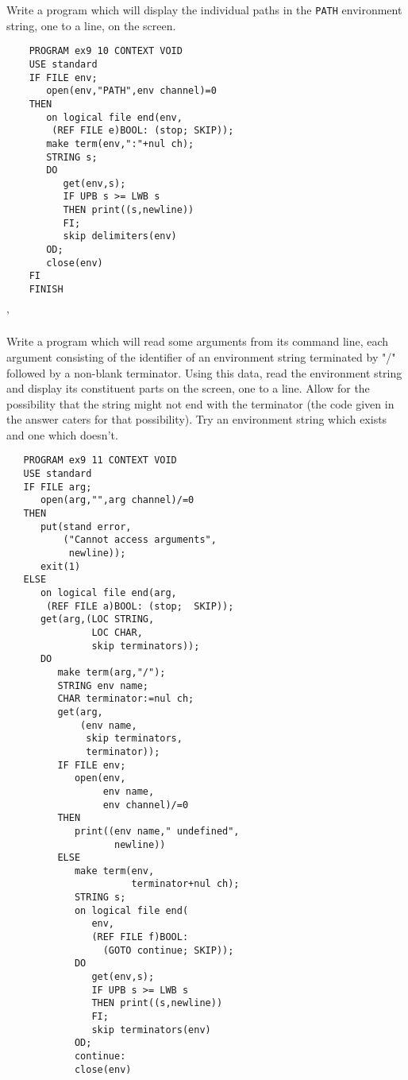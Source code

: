 \begin{exercise}
\item Write a program which will display the individual paths in the
\verb|PATH| environment string, one to a line, on the screen.
\ans \ %
\begin{verbatim}
    PROGRAM ex9 10 CONTEXT VOID
    USE standard
    IF FILE env;
       open(env,"PATH",env channel)=0
    THEN
       on logical file end(env,
        (REF FILE e)BOOL: (stop; SKIP));
       make term(env,":"+nul ch);
       STRING s;
       DO
          get(env,s);
          IF UPB s >= LWB s
          THEN print((s,newline))
          FI;
          skip delimiters(env)
       OD;
       close(env)
    FI
    FINISH
\end{verbatim}
'
\item Write a program which will read some arguments from its command
line, each argument consisting of the identifier of an environment
string terminated by "/" followed by a non-blank terminator. Using
this data, read the environment string and display its constituent
parts on the screen, one to a line. Allow for the possibility that
the string might not end with the terminator (the code given in the
answer caters for that possibility). Try an environment string
which exists and one which doesn't.
\ans \ %
\begin{verbatim}
   PROGRAM ex9 11 CONTEXT VOID
   USE standard
   IF FILE arg;
      open(arg,"",arg channel)/=0
   THEN
      put(stand error,
          ("Cannot access arguments",
           newline));
      exit(1)
   ELSE
      on logical file end(arg,
       (REF FILE a)BOOL: (stop;  SKIP));
      get(arg,(LOC STRING,
               LOC CHAR,
               skip terminators));
      DO
         make term(arg,"/");
         STRING env name;
         CHAR terminator:=nul ch;
         get(arg,
             (env name,
              skip terminators,
              terminator));
         IF FILE env;
            open(env,
                 env name,
                 env channel)/=0
         THEN
            print((env name," undefined",
                   newline))
         ELSE
            make term(env,
                      terminator+nul ch);
            STRING s;
            on logical file end(
               env,
               (REF FILE f)BOOL:
                 (GOTO continue; SKIP));
            DO
               get(env,s);
               IF UPB s >= LWB s
               THEN print((s,newline))
               FI;
               skip terminators(env)
            OD;
            continue:
            close(env)

\end{verbatim}
\end{exercise}
